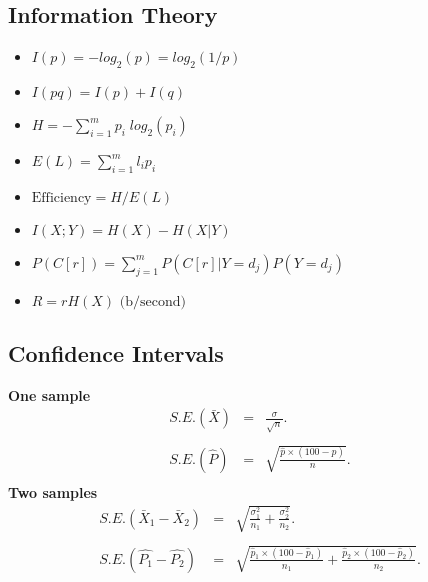 \documentclass[a4paper,12pt]{article}
\begin{document}
\subsection*{Information Theory}

\begin{itemize}
\item $I(p) = - log_{2}(p) = log_{2}(1/p)$\\

\item $I(pq) = I(p) + I(q)$\\

\item $H = - \sum_{i=1}^{m}p_{i}\; log_{2}(p_{i})$\\

\item $E(L) = \sum_{i=1}^{m} l_{i} p_{i}$\\

\item $\mbox{Efficiency} = H / E(L)$\\

\item $I(X;Y) = H(X) - H(X|Y)$\\

\item $P(C[r]) = \sum_{j=1}^{m}P(C[r]|Y=d_{j} )P(Y=d_{j} )$

\item $R = rH(X) \mbox{      (b/second)}$
\end{itemize}

\newpage
\subsection*{Confidence Intervals}
{\bf One sample}
\begin{eqnarray*} S.E.(\bar{X})&=&\frac{\sigma}{\sqrt{n}}.\\\\
S.E.(\hat{P})&=&\sqrt{\frac{\hat{p}\times(100-\hat{p})}{n}}.\\
\end{eqnarray*}
{\bf Two samples}
\begin{eqnarray*}
S.E.(\bar{X}_1-\bar{X}_2)&=&\sqrt{\frac{\sigma^2_1}{n_1}+\frac{\sigma_2^2}{n_2}}.\\\\
S.E.(\hat{P_1}-\hat{P_2})&=&\sqrt{\frac{\hat{p}_1\times(100-\hat{p}_1)}{n_1}+\frac{\hat{p}_2\times(100-\hat{p}_2)}{n_2}}.\\\\
\end{eqnarray*}
\end{document}

